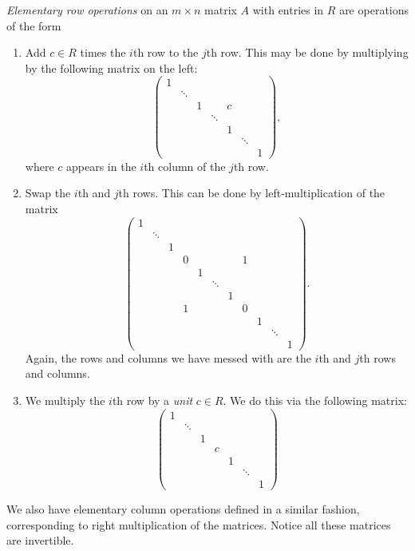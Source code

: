 \documentclass[a4paper]{article}
\begin{document}
\begin{defi}
  \emph{Elementary row operations} on an $m \times n$ matrix $A$ with entries in $R$ are operations of the form
  \begin{enumerate}
    \item Add $c \in R$ times the $i$th row to the $j$th row. This may be done by multiplying by the following matrix on the left:
      \[
        \begin{pmatrix}
          1 \\
          & \ddots \\
          & & 1 & & c\\
          & & & \ddots\\
          & & & & 1\\
          & & & & & \ddots\\
          & & & & & & 1
        \end{pmatrix},
      \]
      where $c$ appears in the $i$th column of the $j$th row.
    \item Swap the $i$th and $j$th rows. This can be done by left-multiplication of the matrix
      \setcounter{MaxMatrixCols}{11}
      \[
        \begin{pmatrix}
          1\\
          & \ddots\\
          & & 1\\
          & & & 0 & & & & 1\\
          & & & & 1\\
          & & & & & \ddots\\
          & & & & & & 1\\
          & & & 1 & & & & 0\\
          & & & & & & & & 1\\
          & & & & & & & & & \ddots\\
          & & & & & & & & & & 1
        \end{pmatrix}.
      \]
      Again, the rows and columns we have messed with are the $i$th and $j$th rows and columns.
    \item We multiply the $i$th row by a \emph{unit} $c \in R$. We do this via the following matrix:
      \[
        \begin{pmatrix}
          1 \\
          & \ddots\\
          & & 1 \\
          & & & c\\
          & & & & 1\\
          & & & & & \ddots\\
          & & & & & & 1
        \end{pmatrix}
      \]
  \end{enumerate}
\end{defi}
We also have elementary column operations defined in a similar fashion, corresponding to right multiplication of the matrices. Notice all these matrices are invertible.
\end{document}
